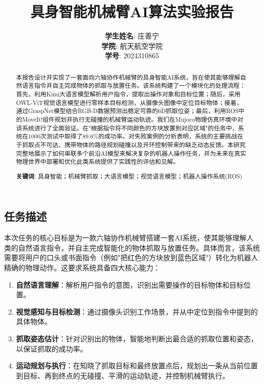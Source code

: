 \documentclass{article}
\title{具身智能机械臂AI算法实验报告}
\author{%
  \textbf{学生姓名}: 庄善宁 \\
  \textbf{学院}: 航天航空学院 \\
  \textbf{学号}: 2024310865 \\
}
\begin{document}
\begin{CJK*}{UTF8}{gbsn}

\maketitle


\begin{abstract}
本报告设计并实现了一套面向六轴协作机械臂的具身智能AI系统，旨在使其能够理解自然语言指令并自主完成物体的抓取与放置任务。该系统构建了一个模块化的处理流程：首先，利用Kimi大语言模型解析用户指令，提取出操作对象和目标位置；随后，采用OWL-ViT视觉语言模型进行零样本目标检测，从摄像头图像中定位目标物体；接着，通过GraspNet模型结合RGB-D数据预测出稳定可靠的6D抓取位姿；最后，利用ROS中的MoveIt!组件规划并执行无碰撞的机械臂运动轨迹。我们在Mujoco物理仿真环境中对该系统进行了全面验证。在"根据指令将不同颜色的方块放置到对应区域"的任务中，系统在1000次测试中取得了89.6\%的成功率。对失败案例的分析表明，系统的主要挑战在于抓取点不可达、携带物体的路径规划碰撞以及开环控制带来的缺乏动态反馈。本研究完整地展示了如何串联多个前沿AI模型来解决复杂的机器人操作任务，并为未来在真实物理世界中部署和优化此类系统提供了实践性的评估和见解。

\textbf{关键词}: 具身智能；机械臂抓取；大语言模型；视觉语言模型；机器人操作系统(ROS)
\end{abstract}

\section{任务描述}

本次任务的核心目标是为一款六轴协作机械臂搭建一套AI系统，使其能够理解人类的自然语言指令，并自主完成智能化的物体抓取与放置任务。具体而言，该系统需要将用户的口头或书面指令（例如"把红色的方块放到蓝色区域"）转化为机器人精确的物理动作。这要求系统具备四大核心能力：

\begin{enumerate}
    \item  \textbf{自然语言理解}：解析用户指令的意图，识别出需要操作的目标物体和目标位置。
    \item  \textbf{视觉感知与目标检测}：通过摄像头识别工作场景，并从中定位到指令中提到的具体物体。
    \item  \textbf{抓取姿态估计}：针对识别出的物体，智能地判断出最合适的抓取位置和姿态，以保证抓取的成功率。
    \item  \textbf{运动规划与执行}：在知晓了抓取目标和最终放置点后，规划出一条从当前位置到目标、再到终点的无碰撞、平滑的运动轨迹，并控制机械臂执行。
\end{enumerate}


\end{CJK*}
\end{document}
